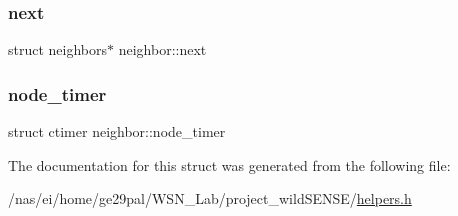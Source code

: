 \subsubsection{\texorpdfstring{next}{next}}
{\footnotesize\ttfamily struct neighbors$\ast$ neighbor\+::next}

\mbox{\label{structneighbor_a64f8c520a732dbb0b958c7d715689f4f}} 
\subsubsection{\texorpdfstring{node\+\_\+timer}{node\_timer}}
{\footnotesize\ttfamily struct ctimer neighbor\+::node\+\_\+timer}



The documentation for this struct was generated from the following file\+:\begin{DoxyCompactItemize}
\item 
/nas/ei/home/ge29pal/\+W\+S\+N\+\_\+\+Lab/project\+\_\+wild\+S\+E\+N\+S\+E/\hyperlink{helpers_8h}{helpers.\+h}\end{DoxyCompactItemize}

